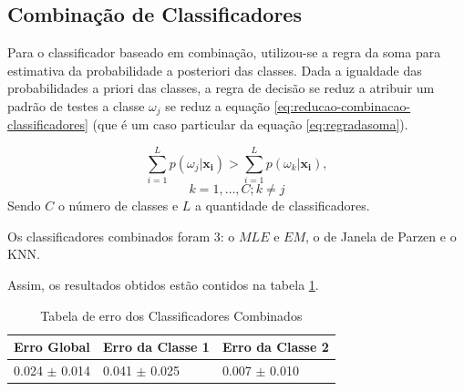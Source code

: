 \subsection{Combinação de Classificadores}
\label{subsec:exp-combinacaodeclassificadores}


Para o classificador baseado em combinação, utilizou-se a regra da soma para estimativa da probabilidade a posteriori das classes. Dada a igualdade das probabilidades a priori das classes, a regra de decisão se reduz a atribuir um padrão de testes a classe $\omega_j$ se reduz a equação \ref{eq:reducao-combinacao-classificadores} (que é um caso particular da equação \ref{eq:regradasoma}).

\begin{equation}
\label{eq:reducao-combinacao-classificadores}
\sum_{i = 1}^{L} p(\omega_j | \mathbf{x_i}) > \sum_{i = 1}^{L} p(\omega_k | \mathbf{x_i}),
\end{equation}
\[k = 1, \ldots, C;     k \ne j \] Sendo $C$ o número de classes e $L$ a quantidade de classificadores.


Os classificadores combinados foram 3: o $MLE$ e $EM$, o de Janela de Parzen e o KNN.

Assim, os resultados obtidos estão contidos na tabela \ref{tab:erro-combinacao}.

\begin{table}[H]
\begin{center}
\begin{tabular}{|l|l|l|}
\hline
Erro Global			&	Erro da Classe 1	&	Erro da Classe 2	\\
\hline %
0.024 $\pm$ 0.014	&	0.041 $\pm$ 0.025	&	0.007 $\pm$ 0.010	\\
\hline
\end{tabular}%
\end{center}   %
\caption{Tabela de erro dos Classificadores Combinados}
\label{tab:erro-combinacao}
\end{table}




